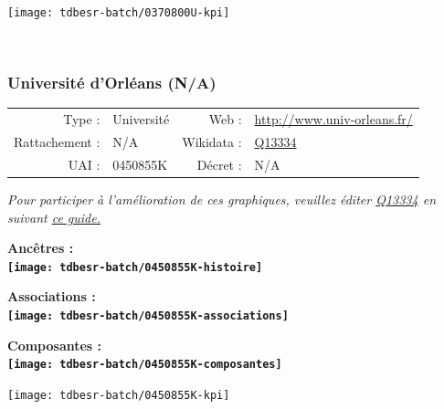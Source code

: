 \documentclass[12pt,french,]{article}
\begin{document}
\begin{center}\texttt{[image: tdbesr-batch/0370800U-kpi]} \end{center}\checkoddpage

\ifoddpage ~\newpage \fi   

\hypertarget{universituxe9-dorluxe9ans-na}{%
\subsubsection{Université d'Orléans
(N/A)}\label{universituxe9-dorluxe9ans-na}}

\begin{tabular*}{\textwidth}{rp{5cm}rl}  
\hline  
Type : & Université & Web : &\href{http://www.univ-orleans.fr/}{http://www.univ-orleans.fr/} \\  
Rattachement : & N/A & Wikidata : & \href{https://www.wikidata.org/entity/Q13334}{Q13334} \\  
UAI : & 0450855K & Décret : & N/A \\  
\hline  
\end{tabular*}

\textit{\scriptsize Pour participer à l'amélioration de ces graphiques, veuillez éditer  \href{https://www.wikidata.org/entity/Q13334}{Q13334}  en suivant \href{https://github.com/cpesr/wikidataESR/blob/master/Rmd/wikidataESR.md}{ce guide.}}

\vspace{1cm}  
\begin{minipage}[b]{0.50\textwidth}\begin{center} \bf Ancêtres : \\  
\texttt{[image: tdbesr-batch/0450855K-histoire]} \end{center}\end{minipage}\begin{minipage}[b]{0.50\textwidth}\begin{center} \bf Associations : \\  
\texttt{[image: tdbesr-batch/0450855K-associations]} \end{center}\end{minipage}

\hrulefill

\begin{center} \bf Composantes : \\  
\texttt{[image: tdbesr-batch/0450855K-composantes]} \end{center}

\begin{center}\texttt{[image: tdbesr-batch/0450855K-kpi]} \end{center}\checkoddpage
\end{document}
